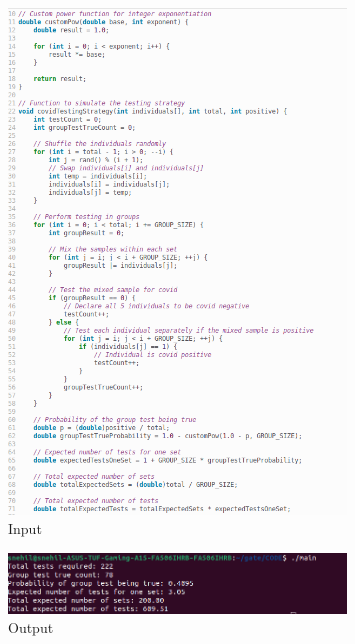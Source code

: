 \documentclass[journal,12pt,onecolumn]{IEEEtran}
\begin{document}
\begin{figure}
    \centering
    \includegraphics[width=0.8\textwidth]{screenshot/input}
    \caption{Input}
    \label{fig:input}
\end{figure}
\begin{figure}
    \centering
    \includegraphics[width=0.8\textwidth]{screenshot/output}
    \caption{Output}
    \label{fig:output}
\end{figure}
\end{document}

